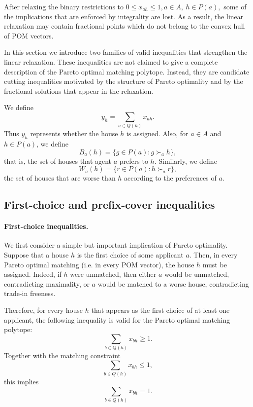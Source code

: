 \documentclass[12pt]{report}
\numberwithin{algorithm}{chapter}
\begin{document}
	After relaxing the binary restrictions to $0\le x_{ah}\le 1, a\in A,\ h\in P(a),$ some of the implications that are enforced by integrality are lost. As a result, the linear relaxation may contain fractional points which do not belong to the convex hull of POM vectors.
	
	In this section we introduce two families of valid inequalities that strengthen the linear relaxation. These inequalities are not claimed to give a complete description of the Pareto optimal matching polytope. Instead, they are candidate cutting inequalities motivated by the structure of Pareto optimality and by the fractional solutions that appear in the relaxation.
	
	We define
	\[
	y_h=\sum_{a\in Q(h)}x_{ah}.
	\]
	Thus $y_{h}$ represents whether the house $h$ is assigned. Also, for $a\in A$ and $h\in P(a)$, we define
	\[
	B_a(h)=\{g\in P(a):g\succ_{a} h\},
	\]
	that is, the set of houses that agent $a$ prefers to $h$. Similarly, we define
	\[
	W_a(h)=\{r\in P(a):h\succ_{a} r\},
	\]
	the set of houses that are worse than $h$ according to the preferences of $a$.
	
	\subsection{First-choice and prefix-cover inequalities}
	
	\paragraph{First-choice inequalities.} We first consider a simple but important implication of Pareto optimality. Suppose that a house $h$ is the first choice of some applicant $a$. Then, in every Pareto optimal matching (i.e. in every POM vector), the house $h$ must be assigned. Indeed, if $h$ were unmatched, then either $a$ would be unmatched, contradicting maximality, or $a$ would be matched to a worse house, contradicting trade-in freeness.
	
	Therefore, for every house $h$ that appears as the first choice of at least one applicant, the following inequality is valid for the Pareto optimal matching polytope:
	\[
	\sum_{b\in Q(h)}x_{bh}\ge 1.
	\]
	Together with the matching constraint
	\[
	\sum_{b\in Q(h)}x_{bh}\le 1,
	\]
	this implies
	\[
	\sum_{b\in Q(h)}x_{bh}=1.
	\]
	
\end{document}
